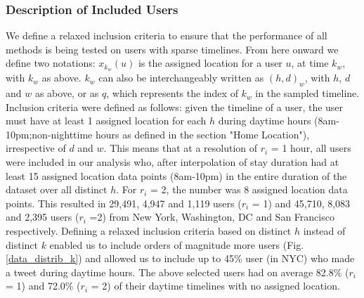 \subsubsection{Description of Included Users}
We define a relaxed inclusion criteria to ensure that the performance of all methods is being tested on users with sparse timelines. From here onward we define two notations: $x_{k_{w}}(u)$ is the assigned location for a user $u$, at time $k_w$, with $k_w$ as above.  $k_w$ can also be interchangeably written as $(h,d)_w$, with $h$, $d$ and $w$ as above, or as $q$, which represents the index of $k_w$ in the sampled timeline. Inclusion criteria were defined as follows: given the timeline of a user, the user must have at least 1 assigned location for each $h$ during daytime hours (8am-10pm;non-nighttime hours as defined in the section "Home Location"), irrespective of $d$ and $w$. This means that at a resolution of $r_i$ = 1 hour, all users were included in our analysis who, after interpolation of stay duration had at least 15 assigned location data points (8am-10pm) in the entire duration of the dataset over all distinct $h$. For $r_i$ = 2, the number was 8 assigned location data points.
This resulted in 29,491, 4,947 and 1,119 users ($r_i$ = 1) and 45,710, 8,083 and 2,395 users ($r_i$ =2) from New York, Washington, DC and San Francisco respectively.
Defining a relaxed inclusion criteria based on distinct $h$ instead of distinct $k$ enabled us to include orders of magnitude more users (Fig. \ref{data_distrib_k}) and allowed us to include up to 45\% user (in NYC) who made a tweet during daytime hours. The above selected users had on average 82.8\% ($r_i$ = 1) and 72.0\% ($r_i$ = 2) of their daytime timelines with no assigned location.


